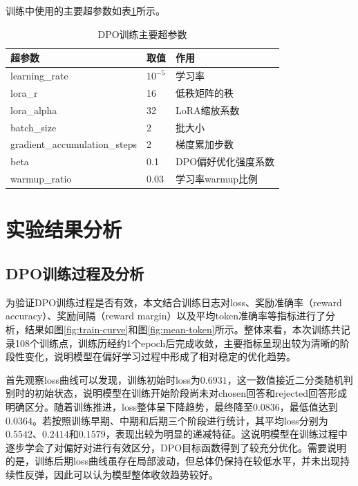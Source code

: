 训练中使用的主要超参数如表\ref{tab:dpo-hyperparams}所示。

\begin{table}[htbp]
    \caption[DPO训练主要超参数]{DPO训练主要超参数}
    \centering
    \begin{tabular}{lll}
        \toprule
        超参数 & 取值 & 作用 \\
        \midrule
        learning\_rate & $10^{-5}$ & 学习率 \\
        lora\_r & 16 & 低秩矩阵的秩 \\
        lora\_alpha & 32 & LoRA缩放系数 \\
        batch\_size & 2 & 批大小 \\
        gradient\_accumulation\_steps & 2 & 梯度累加步数 \\
        beta & 0.1 & DPO偏好优化强度系数 \\
        warmup\_ratio & 0.03 & 学习率warmup比例 \\
        \bottomrule
    \end{tabular}
    \label{tab:dpo-hyperparams}
\end{table}

\section{实验结果分析}

\subsection{DPO训练过程及分析}

为验证DPO训练过程是否有效，本文结合训练日志对loss、奖励准确率（reward accuracy）、奖励间隔（reward margin）以及平均token准确率等指标进行了分析，结果如图\ref{fig:train-curve}和图\ref{fig:mean-token}所示。整体来看，本次训练共记录108个训练点，训练历经约1个epoch后完成收敛，主要指标呈现出较为清晰的阶段性变化，说明模型在偏好学习过程中形成了相对稳定的优化趋势。

首先观察loss曲线可以发现，训练初始时loss为$0.6931$，这一数值接近二分类随机判别时的初始状态，说明模型在训练开始阶段尚未对chosen回答和rejected回答形成明确区分。随着训练推进，loss整体呈下降趋势，最终降至$0.0836$，最低值达到$0.0364$。若按照训练早期、中期和后期三个阶段进行统计，其平均loss分别为$0.5542$、$0.2414$和$0.1579$，表现出较为明显的递减特征。这说明模型在训练过程中逐步学会了对偏好对进行有效区分，DPO目标函数得到了较充分优化。需要说明的是，训练后期loss曲线虽存在局部波动，但总体仍保持在较低水平，并未出现持续性反弹，因此可以认为模型整体收敛趋势较好。

